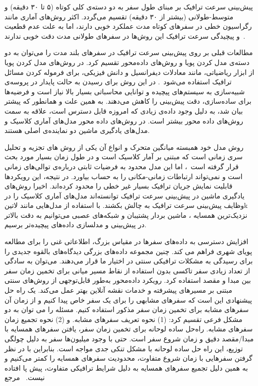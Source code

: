 
پیش‌بینی سرعت ترافیک بر مبنای طول سفر به دو دسته‌ی کلی کوتاه (۵ تا ۳۰ دقیقه) و متوسط-طولانی (بیشتر از ۳۰ دقیقه) تقسیم می‌گردد.
اکثر روش‌های آماری مانند رگراسیون خطی در سفرهای کوتاه مدت عملکرد خوبی دارند، اما به علت عدم قطعیت و پیچیدگی سرعت ترافیک این روش‌ها در سفرهای طولانی مدت دقت خوبی ندارند~.

مطالعات قبلی بر روی پیش‌بینی سرعت ترافیک در سفرهای بلند مدت را می‌توان به دو دسته‌ی مدل کردن پویا و روش‌های داده‌محور تقسیم کرد.
در روش‌های مدل کردن پویا از ابزار ریاضیاتی، مانند معادلات دیفرانسیل و دانش فیزیکی، برای فرموله کردن مسائل ترافیک استفاده می‌شود~.
در این روش برای رسیدن به حالت پایدار در پروسه‌ی شبیه‌سازی به سیستم‌های پیچیده و توانایی محاسباتی بسیار بالا نیاز است و فرضیه‌ها برای ساده‌سازی، دقت پیش‌بینی را کاهش می‌دهند.
به همین علت و همانطور که پیشتر بیان شد، به دلیل وجود داده‌ی زیادی که امروزه قابل دسترس است، علاقه به سمت روش‌های داده محور بیشتر است.
در روش‌های داده محور مدل‌های آماری کلاسیک و مدل‌های یادگیری ماشین دو نماینده‌ی اصلی هستند.

روش مدل خود همبسته میانگین متحرک و انواع آن یکی از روش های تجزیه و تحلیل سری زمانی است که مبتنی بر آمار کلاسیک است
و در طول زمان بسیار مورد بحث قرار گرفته است~،
اما این مدل محدود به فرضیات ثابتی درباره‌ی توالی‌های زمانی است و نمی‌تواند ارتباطات زمانی-مکانی را به حساب بیاورد. در نتیجه، این رویکردها قابلیت نمایش جریان ترافیک بسیار غیر خطی را محدود کرده‌اند.
اخیرا روش‌های یادگیری ماشین در پیش‌بینی سرعت ترافیک توانسته‌اند مدل‌های آماری کلاسیک را در وظایف پیش‌بینی سرعت ترافیک به چالش بکشند. با استفاده از مدل‌هایی مانند ‌لاتین{k} نزدیک‌ترین همسایه ، ماشین بردار پشتیبان  و شبکه‌های عصبی  می‌توانیم به دقت بالاتر در پیش‌بینی و مدلسازی داده‌های پیچیده‌تر برسیم.

افزایش دسترسی به داده‌های سفرها در مقیاس بزرگ، اطلاعاتی غنی را برای مطالعه پویای شهری فراهم می کند. چنین مجموعه داده‌های بزرگی دیدگاه‌های بالقوه جدیدی را برای رسیدگی به مشکلات ترافیکی سنتی در اختیار ما قرار می‌دهند. می‌توان به سادگی از تعداد زیادی سفر تاکسی بدون استفاده از نقاط مسیر میانی برای تخمین زمان سفر بین مبدا و مقصد استفاده کرد. رویکرد داده‌محور به‌طور قابل‌توجهی از روش‌های سنتی مبتنی بر مسیرهای پیشرفته و خدمات نقشه آنلاین بهتر عمل می‌کند. یک راه حل پیشنهادی این است که سفرهای مشابهی را برای یک سفر خاص پیدا کنیم و از زمان آن سفرهای مشابه برای تخمین زمان سفر مذکور استفاده کنیم. مسئله را می توان به دو مشکل فرعی تقسیم کرد: (1) نحوه تعریف سفرهای مشابه. و (2) نحوه تجمیع زمان سفرهای مشابه. راه‌حل ساده لوحانه برای تخمین زمان سفر، یافتن سفرهای همسایه با مبدا/مقصد دقیق و زمان شروع سفر است. حتی با وجود میلیون‌ها سفر به دلیل چولگی توزیع، این راه حل ساده لوحانه با مشکل تنکی جدی مواجه است. بنابراین با در نظر گرفتن سفرهایی با زمان شروع متفاوت، محدودیت سفرهای همسایه را کمتر می‌کنیم و به همین دلیل تجمیع سفرهای همسایه به دلیل شرایط ترافیکی متفاوت، پیش پا افتاده نیست. ~مرجع

